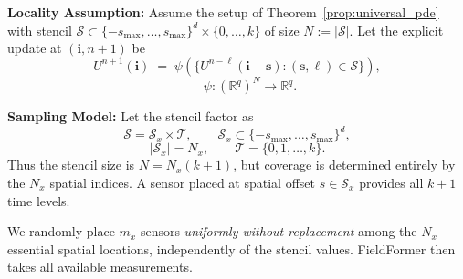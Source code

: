 \begin{assumption}
\label{ass:locality}
\noindent\textbf{Locality Assumption:} Assume the setup of Theorem~\ref{prop:universal_pde} with stencil
$\mathcal{S}\subset \{-s_{\max},\ldots,s_{\max}\}^d\times\{0,\ldots,k\}$ of size $N:=|\mathcal{S}|$.
Let the explicit update at $(\mathbf{i},n{+}1)$ be
\[
U^{n+1}(\mathbf{i}) \;=\; \psi\!\left(\{U^{n-\ell}(\mathbf{i}+\mathbf{s}) : (\mathbf{s},\ell)\in \mathcal{S}\}\right),\]
\[
\qquad \psi:(\mathbb{R}^{q})^{N}\to\mathbb{R}^q.
\]
\end{assumption}


\begin{assumption}
\label{ass:sampling}
\noindent\textbf{Sampling Model:}
Let the stencil factor as
\[
\mathcal{S} = \mathcal{S}_x \times \mathcal{T},
\qquad \mathcal{S}_x \subset \{-s_{\max},\ldots,s_{\max}\}^d,\]
\[|\mathcal{S}_x|=N_x,
\qquad \mathcal{T}=\{0,1,\ldots,k\}.
\]
Thus the stencil size is $N=N_x(k+1)$, but coverage is determined entirely by the $N_x$ spatial
indices. A sensor placed at spatial offset $s\in\mathcal{S}_x$ provides all $k{+}1$ time levels.

We randomly place $m_x$ sensors \emph{uniformly without replacement} among the $N_x$ essential
spatial locations, independently of the stencil values. FieldFormer then takes all available measurements.
\end{assumption}

